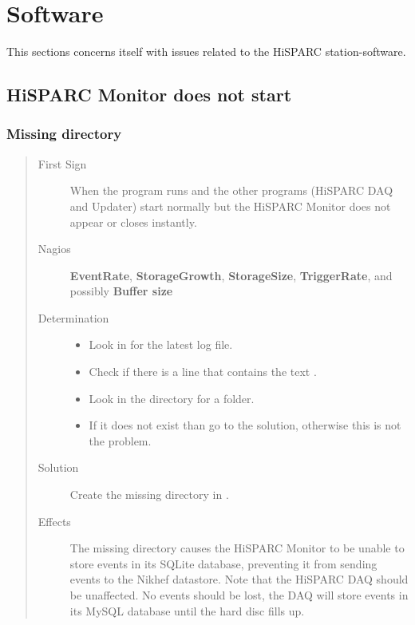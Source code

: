 \documentclass[a4paper,11pt,english]{sphinxmanual}
\begin{document}
\section{Software}
\label{known-issues:software}
This sections concerns itself with issues related to the HiSPARC
station-software.


\subsection{HiSPARC Monitor does not start}
\label{known-issues:hisparc-monitor-does-not-start}

\subsubsection{Missing directory}
\label{known-issues:missing-directory}\begin{quote}\begin{description}
\item[{First Sign}] \leavevmode
When the  program runs and the
other programs (HiSPARC DAQ and Updater) start normally
but the HiSPARC Monitor does not appear or closes
instantly.

\item[{Nagios}] \leavevmode
\textbf{EventRate}, \textbf{StorageGrowth}, \textbf{StorageSize},
\textbf{TriggerRate}, and possibly \textbf{Buffer size}

\item[{Determination}] \leavevmode\begin{itemize}
\item {} 
Look in  for the latest log
file.

\item {} 
Check if there is a line that contains the text .

\item {} 
Look in the  directory for a
 folder.

\item {} 
If it does not exist than go to the solution, otherwise this is
not the problem.

\end{itemize}

\item[{Solution}] \leavevmode
Create the missing  directory in
.

\item[{Effects}] \leavevmode
The missing directory causes the HiSPARC Monitor to be
unable to store events in its SQLite database, preventing it
from sending events to the Nikhef datastore. Note that the
HiSPARC DAQ should be unaffected. No events should be lost,
the DAQ will store events in its MySQL database until the hard
disc fills up.

\end{description}\end{quote}
\end{document}
